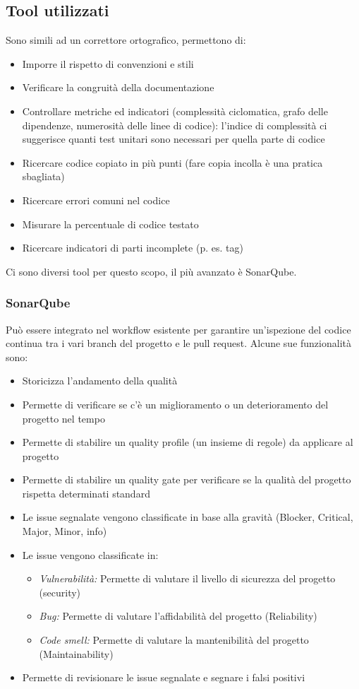 \documentclass[10pt, a4paper]{article}
\begin{document}
\subsection{Tool utilizzati}
Sono simili ad un correttore ortografico, permettono di:
\begin{itemize}
    \item Imporre il rispetto di convenzioni e stili
    \item Verificare la congruità della documentazione
    \item Controllare metriche ed indicatori (complessità ciclomatica, grafo delle dipendenze, numerosità delle linee di codice): l'indice di complessità ci suggerisce quanti test unitari sono necessari per quella parte di codice
    \item Ricercare codice copiato in più punti (fare copia incolla è una pratica sbagliata)
    \item Ricercare errori comuni nel codice
    \item Misurare la percentuale di codice testato
    \item Ricercare indicatori di parti incomplete (p. es. tag)
\end{itemize}
Ci sono diversi tool per questo scopo, il più avanzato è SonarQube.

\subsubsection*{SonarQube}
Può essere integrato nel workflow esistente per garantire un'ispezione del codice continua tra i vari branch del progetto e le pull request. Alcune sue funzionalità sono:
\begin{itemize}
    \item Storicizza l’andamento della qualità
    \item Permette di verificare se c’è un miglioramento o un deterioramento del progetto nel tempo
    \item Permette di stabilire un quality profile (un insieme di regole) da applicare al progetto
    \item Permette di stabilire un quality gate per verificare se la qualità del progetto rispetta determinati standard
    \item Le issue segnalate vengono classificate in base alla gravità (Blocker, Critical, Major, Minor, info)
    \item Le issue vengono classificate in:
    \begin{itemize}
        \item \textit{Vulnerabilità:}  Permette di valutare il livello di sicurezza del progetto (security)
        \item \textit{Bug:} Permette di valutare l’affidabilità del progetto (Reliability)
        \item \textit{Code smell:}  Permette di valutare la mantenibilità del progetto (Maintainability)
    \end{itemize}
    \item Permette di revisionare le issue segnalate e segnare i falsi positivi
\end{itemize}
\end{document}
